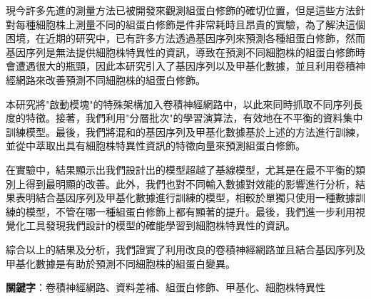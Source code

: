 現今許多先進的測量方法已被開發來觀測組蛋白修飾的確切位置，但是這些方法針對每種細胞株上測量不同的組蛋白修飾是件非常耗時且昂貴的實驗，為了解決這個困境，在近期的研究中，已有許多方法透過基因序列來預測各種組蛋白修飾，然而基因序列是無法提供細胞株特異性的資訊，導致在預測不同細胞株的組蛋白修飾時會遭遇很大的瓶頸，因此本研究引入了基因序列以及甲基化數據，並且利用卷積神經網路來改善預測不同細胞株的組蛋白修飾。

本研究將"啟動模塊"的特殊架構加入卷積神經網路中，以此來同時抓取不同序列長度的特徵。接著，我們利用"分層批次"的學習演算法，有效地在不平衡的資料集中訓練模型。最後，我們將混和的基因序列及甲基化數據基於上述的方法進行訓練，並從中萃取出具有細胞株特異性資訊的特徵向量來預測組蛋白修飾。

在實驗中，結果顯示出我們設計出的模型超越了基線模型，尤其是在最不平衡的類別上得到最明顯的改善。此外，我們也對不同輸入數據對效能的影響進行分析，結果表明結合基因序列及甲基化數據進行訓練的模型，相較於單獨只使用一種數據訓練的模型，不管在哪一種組蛋白修飾上都有顯著的提升。最後，我們進一步利用視覺化工具發現我們設計的模型的確能學習到細胞株特異性的資訊。

綜合以上的結果及分析，我們證實了利用改良的卷積神經網路並且結合基因序列及甲基化數據是有助於預測不同細胞株的組蛋白變異。








\begin{flushleft}
\mbox{{\bf 關鍵字}：卷積神經網路、資料差補、組蛋白修飾、甲基化、細胞株特異性}
\end{flushleft}
